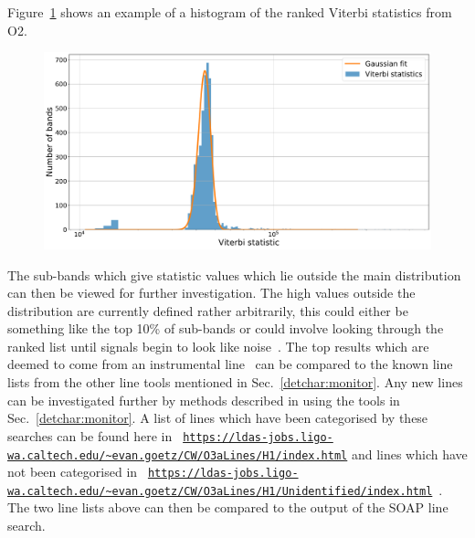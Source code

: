 Figure~\ref{detchar:soap:rankedstats} shows an example of a
histogram of the ranked Viterbi statistics from O2. 
%
\begin{figure}[ht]
	\centering
	\includegraphics[width=\textwidth]{C5_detchar/statistic_hists_O3_H1.pdf}
	\caption[Viterbi statistics for H1 in O3]{ }
	\label{detchar:soap:rankedstats}
\end{figure}
%
The sub-bands which give statistic
values which lie outside the main distribution can then be viewed for further
investigation. The high values outside the distribution are currently defined
rather arbitrarily, this could either be something like the top 10\% of
sub-bands or could involve looking through the ranked list until signals begin
to look like noise~. The top results which are deemed to come from an
instrumental line~ can be compared to the known line lists from the other line
tools mentioned in Sec.~\ref{detchar:monitor}.  Any new lines can be
investigated further by methods described in
\citep{covas2018IdentificationMitigation} using the tools in
Sec.~\ref{detchar:monitor}.  A list of lines which have been categorised by
these searches can be found here in {\tt
\url{https://ldas-jobs.ligo-wa.caltech.edu/~evan.goetz/CW/O3aLines/H1/index.html}}
and lines which have not been categorised in {\tt
\url{https://ldas-jobs.ligo-wa.caltech.edu/~evan.goetz/CW/O3aLines/H1/Unidentified/index.html}}~.
The two line lists above can then be compared to the output of the SOAP line
search.~


